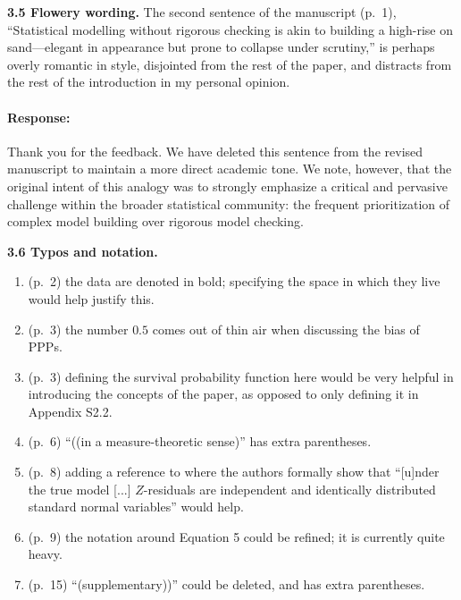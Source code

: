 \documentclass[11pt]{article}
\newcommand*{\mybox}[2]{%
  \par\medskip\noindent
  \colorbox{#1!30}{\parbox{.98\linewidth}{#2}}%
  \par\medskip
}
\begin{document}
\mybox{gray}{\textbf{3.5 Flowery wording.} The second sentence of the manuscript (p.~1), ``Statistical modelling without rigorous checking is akin to building a high-rise on sand---elegant in appearance but prone to collapse under scrutiny,'' is perhaps overly romantic in style, disjointed from the rest of the paper, and distracts from the rest of the introduction in my personal opinion.}

\paragraph{Response:}

Thank you for the feedback. We have deleted this sentence from the revised manuscript to maintain a more direct academic tone. We note, however, that the original intent of this analogy was to strongly emphasize a critical and pervasive challenge within the broader statistical community: the frequent prioritization of complex model building over rigorous model checking.



\mybox{gray}{\textbf{3.6 Typos and notation.}
\begin{enumerate}
    \item (p.~2) the data are denoted in bold; specifying the space in which they live would help justify this.
    \item (p.~3) the number $0.5$ comes out of thin air when discussing the bias of PPPs.
    \item (p.~3) defining the survival probability function here would be very helpful in introducing the concepts of the paper, as opposed to only defining it in Appendix S2.2.
    \item (p.~6) ``((in a measure-theoretic sense)'' has extra parentheses.
    \item (p.~8) adding a reference to where the authors formally show that ``[u]nder the true model [...] $Z$-residuals are independent and identically distributed standard normal variables'' would help.
    \item (p.~9) the notation around Equation 5 could be refined; it is currently quite heavy.
    \item (p.~15) ``(supplementary))'' could be deleted, and has extra parentheses.
\end{enumerate}}
\end{document}
